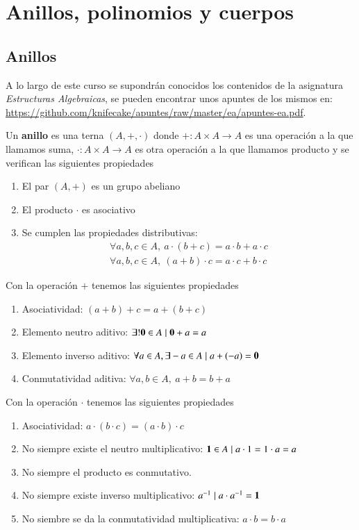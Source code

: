
\chapter{Anillos, polinomios y cuerpos}

\section{Anillos}

A lo largo de este curso se supondrán conocidos los contenidos de la asignatura \textit{Estructuras Algebraicas}, se pueden encontrar unos apuntes de los mismos en: \url{https://github.com/knifecake/apuntes/raw/master/ea/apuntes-ea.pdf}.

\begin{dfn}[Anillo]
	Un \textbf{anillo} es una terna $(A, +, \cdot)$ donde $+: A \times A \to A$ es una operación a la que llamamos suma, $\cdot: A \times A \to A$ es otra operación a la que llamamos producto y se verifican las siguientes propiedades
	\begin{enumerate}
		\item El par $(A, +)$ es un grupo abeliano
		\item El producto $\cdot$ es asociativo
		\item Se cumplen las propiedades distributivas:
		\begin{align}
			\forall a, b , c \in A,\ a\cdot (b + c) = a\cdot b + a \cdot c \\
			\forall a, b , c \in A,\ (a + b) \cdot c = a\cdot c + b \cdot c
		\end{align}
	\end{enumerate}
\end{dfn}

Con la operación $+$ tenemos las siguientes propiedades
\begin{enumerate}
	\item Asociatividad: $(a+b)+c = a+(b+c)$
	\item Elemento neutro aditivo: $\exists! \mathbf{0} \in A \mid \mathbf{0}+a = a$
	\item Elemento inverso aditivo: $\forall a \in A, \exists -a \in A \mid a + (-a) = \mathbf{0}$
	\item Conmutatividad aditiva: $\forall a, b \in A,\ a+b = b+a$
\end{enumerate}

Con la operación $\cdot$ tenemos las siguientes propiedades
\begin{enumerate}
	\item Asociatividad: $a\cdot (b \cdot c) = (a \cdot b) \cdot c$
	\item No siempre existe el neutro multiplicativo: $\mathbf{1} \in A \mid a\cdot 1 = 1 \cdot a = a$
	\item No siempre el producto es conmutativo.
	\item No siempre existe inverso multiplicativo: $a^{-1} \mid a\cdot a^{-1} = \mathbf{1}$
	\item No siembre se da la conmutatividad multiplicativa: $a \cdot b = b\cdot a$
\end{enumerate}

